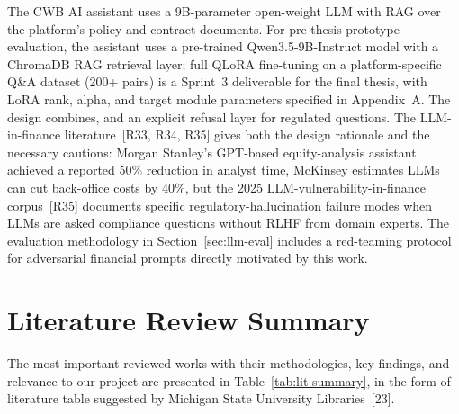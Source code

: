 \documentclass[12pt,a4paper]{report}
\begin{document}
The CWB AI assistant uses a 9B-parameter open-weight LLM with RAG over the platform's policy and contract documents. For pre-thesis prototype evaluation, the assistant uses a pre-trained Qwen3.5-9B-Instruct model with a ChromaDB RAG retrieval layer; full QLoRA fine-tuning on a platform-specific Q\&A dataset (200+ pairs) is a Sprint~3 deliverable for the final thesis, with LoRA rank, alpha, and target module parameters specified in Appendix~A. The design combines, and an explicit refusal layer for regulated questions. The LLM-in-finance literature~[R33, R34, R35] gives both the design rationale and the necessary cautions: Morgan Stanley's GPT-based equity-analysis assistant achieved a reported 50\% reduction in analyst time, McKinsey estimates LLMs can cut back-office costs by 40\%, but the 2025 LLM-vulnerability-in-finance corpus~[R35] documents specific regulatory-hallucination failure modes when LLMs are asked compliance questions without RLHF from domain experts. The evaluation methodology in Section~\ref{sec:llm-eval} includes a red-teaming protocol for adversarial financial prompts directly motivated by this work.

\section{Literature Review Summary}

The most important reviewed works with their methodologies, key findings, and relevance to our project are presented in Table~\ref{tab:lit-summary}, in the form of literature table suggested by Michigan State University Libraries~[23].
\end{document}
